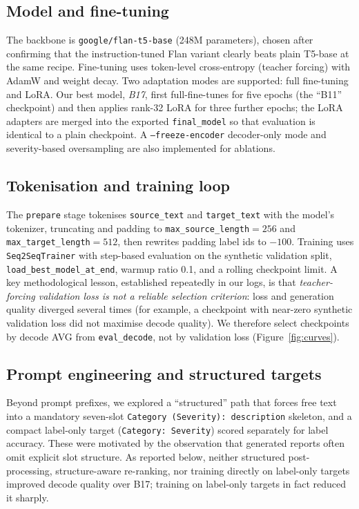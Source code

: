\documentclass[11pt,twocolumn]{article}
\newcommand{\bt}[1]{\texttt{#1}}
\begin{document}
\subsection{Model and fine-tuning}
The backbone is \bt{google/flan-t5-base} (248M parameters), chosen after confirming that the
instruction-tuned Flan variant clearly beats plain T5-base at the same recipe. Fine-tuning uses
token-level cross-entropy (teacher forcing) with AdamW and weight decay. Two adaptation modes are
supported: full fine-tuning and LoRA. Our best model, \emph{B17}, first full-fine-tunes for five
epochs (the ``B11'' checkpoint) and then applies rank-32 LoRA for three further epochs; the LoRA
adapters are merged into the exported \bt{final\_model} so that evaluation is identical to a plain
checkpoint. A \bt{--freeze-encoder} decoder-only mode and severity-based oversampling are also
implemented for ablations.

\subsection{Tokenisation and training loop}
The \bt{prepare} stage tokenises \bt{source\_text} and \bt{target\_text} with the model's
tokenizer, truncating and padding to \bt{max\_source\_length}$=256$ and
\bt{max\_target\_length}$=512$, then rewrites padding label ids to $-100$. Training uses
\bt{Seq2SeqTrainer} with step-based evaluation on the synthetic validation split,
\bt{load\_best\_model\_at\_end}, warmup ratio 0.1, and a rolling checkpoint limit. A key
methodological lesson, established repeatedly in our logs, is that \emph{teacher-forcing
validation loss is not a reliable selection criterion}: loss and generation quality diverged
several times (for example, a checkpoint with near-zero synthetic validation loss did not
maximise decode quality). We therefore select checkpoints by decode AVG from \bt{eval\_decode},
not by validation loss (Figure~\ref{fig:curves}).

\subsection{Prompt engineering and structured targets}
Beyond prompt prefixes, we explored a ``structured'' path that forces free text into a mandatory
seven-slot \bt{Category (Severity): description} skeleton, and a compact label-only target
(\bt{Category: Severity}) scored separately for label accuracy. These were motivated by the
observation that generated reports often omit explicit slot structure. As reported below, neither
structured post-processing, structure-aware re-ranking, nor training directly on label-only
targets improved decode quality over B17; training on label-only targets in fact reduced it
sharply.
\end{document}
